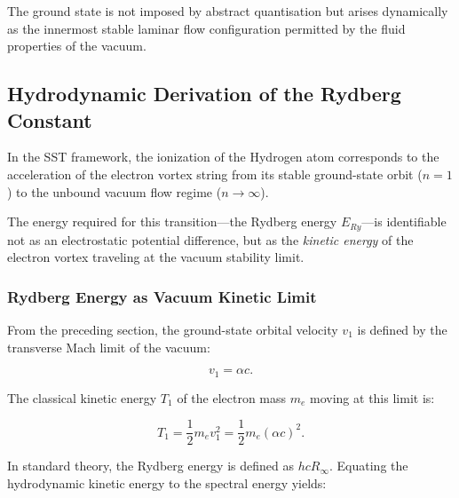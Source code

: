 \documentclass[10pt,reprint,aps,onecolumn,nofootinbib]{revtex4-2}
\begin{document}
            The ground state is not imposed by abstract quantisation but arises
            dynamically as the innermost stable laminar flow configuration permitted
            by the fluid properties of the vacuum.
    \subsection{Hydrodynamic Derivation of the Rydberg Constant}
        \label{sec:SST_rydberg}

        In the SST framework, the ionization of the Hydrogen atom corresponds to
        the acceleration of the electron vortex string from its stable ground-state
        orbit ($n=1$) to the unbound vacuum flow regime ($n \to \infty$).

        The energy required for this transition—the Rydberg energy $E_{Ry}$—is
        identifiable not as an electrostatic potential difference, but as the
        \emph{kinetic energy} of the electron vortex traveling at the vacuum
        stability limit.

        \subsubsection*{Rydberg Energy as Vacuum Kinetic Limit}

            From the preceding section, the ground-state orbital velocity $v_1$ is
            defined by the transverse Mach limit of the vacuum:

            \begin{equation}
                v_1 = \alpha c.
                \label{eq:v1_mach}
            \end{equation}

            The classical kinetic energy $T_1$ of the electron mass $m_e$ moving
            at this limit is:

            \begin{equation}
                T_1 = \frac{1}{2} m_e v_1^2 = \frac{1}{2} m_e (\alpha c)^2.
            \end{equation}

            In standard theory, the Rydberg energy is defined as $hcR_\infty$.
            Equating the hydrodynamic kinetic energy to the spectral energy yields:
\end{document}
